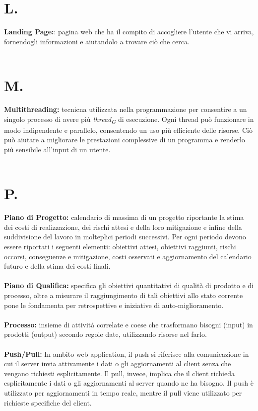 \documentclass[a4paper, 12pt]{article}
\begin{document}
\newpage
\section*{L.}
\textbf{Landing Page:}: pagina web che ha il compito di accogliere l'utente che vi arriva, fornendogli informazioni e aiutandolo a trovare ciò che cerca. \\ \\

\newpage
\section*{M.}
\textbf{Multithreading:} tecnicna utilizzata nella programmazione per consentire a un singolo processo di avere più \textit{thread\textsubscript{G}} di esecuzione. Ogni thread può funzionare in modo indipendente e parallelo, consentendo un uso più efficiente delle risorse. Ciò può aiutare a migliorare le prestazioni complessive di un programma e renderlo più sensibile all'input di un utente. \\ \\

\newpage
\section*{P.}
\textbf{Piano di Progetto:} calendario di massima di un progetto riportante la stima dei costi di realizzazione, dei rischi attesi e della loro mitigazione e infine della suddivisione del lavoro in molteplici periodi successivi. Per ogni periodo devono essere riportati i seguenti elementi: obiettivi attesi, obiettivi raggiunti, rischi occorsi, conseguenze e mitigazione, costi osservati e aggiornamento del calendario futuro e della stima dei costi finali. \\ \\
\textbf{Piano di Qualifica:} specifica gli obiettivi quantitativi di qualità di prodotto e di processo, oltre a misurare il raggiungimento di tali obiettivi allo stato corrente pone le fondamenta per retrospettive e iniziative di auto-miglioramento. \\ \\
\textbf{Processo:} insieme di attività correlate e coese che trasformano bisogni (input) in prodotti (output) secondo regole date, utilizzando risorse nel farlo. \\ \\
\textbf{Push/Pull:} In ambito web application, il push si riferisce alla comunicazione in cui il server invia attivamente i dati o gli aggiornamenti al client senza che vengano richiesti esplicitamente. Il pull, invece, implica che il client richieda esplicitamente i dati o gli aggiornamenti al server quando ne ha bisogno. Il push è utilizzato per aggiornamenti in tempo reale, mentre il pull viene utilizzato per richieste specifiche del client. \\ \\
\end{document}
